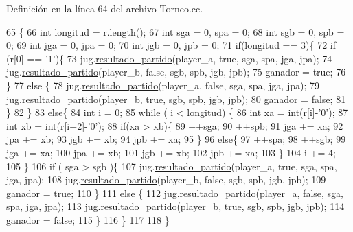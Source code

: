 Definición en la línea 64 del archivo Torneo.\+cc.


\begin{DoxyCode}
65 \{
66   \textcolor{keywordtype}{int} longitud = r.length();
67   \textcolor{keywordtype}{int} sga = 0, spa = 0;
68   \textcolor{keywordtype}{int} sgb = 0,  spb = 0;
69   \textcolor{keywordtype}{int} jga = 0, jpa = 0;
70   \textcolor{keywordtype}{int} jgb = 0, jpb = 0;
71   \textcolor{keywordflow}{if}(longitud == 3)\{
72     \textcolor{keywordflow}{if} (r[0] == \textcolor{charliteral}{'1'})\{
73       jug.\hyperlink{class_cjt__jugadores_a843a0aa4f91b785797a5023c23766bf9}{resultado\_partido}(player\_a, \textcolor{keyword}{true}, sga, spa, jga, jpa);
74       jug.\hyperlink{class_cjt__jugadores_a843a0aa4f91b785797a5023c23766bf9}{resultado\_partido}(player\_b, \textcolor{keyword}{false}, sgb, spb, jgb, jpb);
75       ganador = \textcolor{keyword}{true};
76     \}
77     \textcolor{keywordflow}{else} \{
78       jug.\hyperlink{class_cjt__jugadores_a843a0aa4f91b785797a5023c23766bf9}{resultado\_partido}(player\_a, \textcolor{keyword}{false}, sga, spa, jga, jpa);
79       jug.\hyperlink{class_cjt__jugadores_a843a0aa4f91b785797a5023c23766bf9}{resultado\_partido}(player\_b, \textcolor{keyword}{true}, sgb, spb, jgb, jpb);
80       ganador = \textcolor{keyword}{false};
81     \}
82   \}
83   \textcolor{keywordflow}{else}\{
84     \textcolor{keywordtype}{int} i = 0;
85     \textcolor{keywordflow}{while} ( i < longitud) \{
86       \textcolor{keywordtype}{int} xa = int(r[i]-\textcolor{charliteral}{'0'});
87       \textcolor{keywordtype}{int} xb = int(r[i+2]-\textcolor{charliteral}{'0'});
88       \textcolor{keywordflow}{if}(xa > xb)\{
89         ++sga;
90         ++spb;
91         jga += xa;
92         jpa += xb;
93         jgb += xb;
94         jpb += xa;
95       \}
96       \textcolor{keywordflow}{else}\{
97         ++spa;
98         ++sgb;
99         jga += xa;
100         jpa += xb;
101         jgb += xb;
102         jpb += xa;
103       \}
104       i += 4;
105     \}
106     \textcolor{keywordflow}{if} ( sga > sgb )\{
107       jug.\hyperlink{class_cjt__jugadores_a843a0aa4f91b785797a5023c23766bf9}{resultado\_partido}(player\_a, \textcolor{keyword}{true}, sga, spa, jga, jpa); 
108       jug.\hyperlink{class_cjt__jugadores_a843a0aa4f91b785797a5023c23766bf9}{resultado\_partido}(player\_b, \textcolor{keyword}{false}, sgb, spb, jgb, jpb);
109       ganador = \textcolor{keyword}{true};
110     \}
111     \textcolor{keywordflow}{else} \{
112       jug.\hyperlink{class_cjt__jugadores_a843a0aa4f91b785797a5023c23766bf9}{resultado\_partido}(player\_a, \textcolor{keyword}{false}, sga, spa, jga, jpa);
113       jug.\hyperlink{class_cjt__jugadores_a843a0aa4f91b785797a5023c23766bf9}{resultado\_partido}(player\_b, \textcolor{keyword}{true}, sgb, spb, jgb, jpb);
114       ganador = \textcolor{keyword}{false};
115     \}
116   \}
117   
118 \}
\end{DoxyCode}
\mbox{\label{class_torneo_a791793b8131e964b1387b84f849ae2cd}} 
